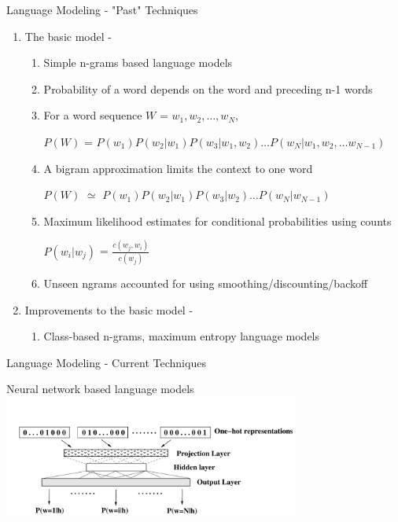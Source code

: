 \begin{frame}{Language Modeling - "Past" Techniques}
\begin{enumerate}
\item The \alert{basic} model -
	\begin{enumerate}
	\item Simple \alert{n-grams} based language models
	\item Probability of a word depends on the word and preceding n-1 words
	\item For a word sequence $W$ = $w_1,w_2,\dots,w_N$, \\
        \begin{center}$P(W)$ = $P(w_1)P(w_2|w_1)P(w_3|w_1,w_2)\dots P(w_N|w_1,w_2,\dots w_{N-1})$\end{center}
	\item A bigram approximation limits the context to one word \\
        \begin{center}$P(W)$ $\simeq$ $P(w_1)P(w_2|w_1)P(w_3|w_2)\dots P(w_N|w_{N-1})$\end{center}
        \item Maximum likelihood estimates for conditional probabilities using counts\\
        \begin{center}$P(w_i|w_j)$ = $\frac{c(w_j,w_i)}{c(w_j)}$\end{center}
	\item Unseen ngrams accounted for using smoothing/discounting/backoff
	\end{enumerate}
\item \alert{Improvements to the basic model} -
	\begin{enumerate}
	\item Class-based n-grams, maximum entropy language models
	\end{enumerate}
\end{enumerate}
\end{frame}

\begin{frame}{Language Modeling - Current Techniques}
\begin{center}
Neural network based language models \\

\includegraphics[height=40mm]{figures/lm-mlp}
\end{center}
\end{frame}

